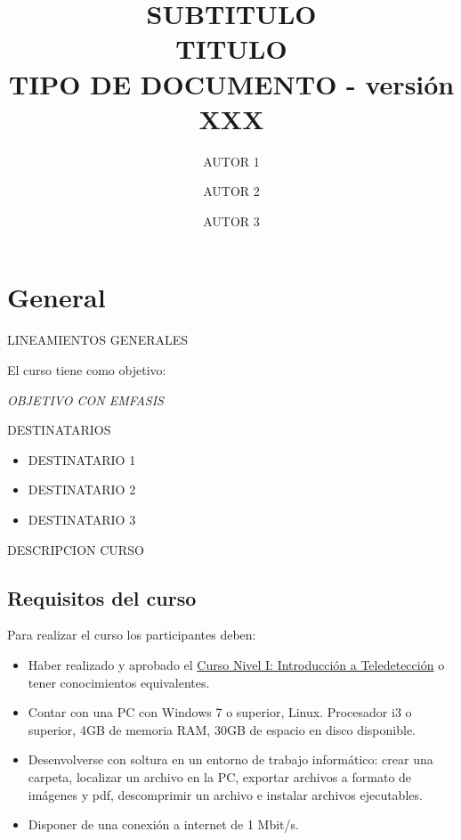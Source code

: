 \documentclass[12pt]{report}
\title{\vfill{\large SUBTITULO} \\ TITULO \\ {\large TIPO DE DOCUMENTO - versión XXX}}
\author[*]{AUTOR 1}
\author[*]{AUTOR 2}
\author[*]{AUTOR 3}
\affil[*]{Unidad de Formación Masiva}
\date{}
\begin{document}
\maketitle
\titlepage
%
\addtolength{\voffset}{-2cm}
\addtolength{\headsep}{0.5cm}
\addtolength{\textheight}{1cm}
\newpage
\tableofcontents


\chapter{General}

LINEAMIENTOS GENERALES

El curso tiene como objetivo:

\begin{displayquote}
\emph{OBJETIVO CON EMFASIS}
\end{displayquote}

DESTINATARIOS

\begin{itemize}
    \item DESTINATARIO 1
    \item DESTINATARIO 2
    \item DESTINATARIO 3
\end{itemize}

DESCRIPCION CURSO

\section{Requisitos del curso}

Para realizar el curso los participantes deben:

\begin{itemize}
    \item Haber realizado y aprobado el \href{https://www.argentina.gob.ar/cursos-y-capacitaciones/nivel-i-introduccion-la-teledeteccion}{Curso Nivel I: Introducción a Teledetección} o tener conocimientos equivalentes. 
    \item Contar con una PC con Windows 7 o superior, Linux. Procesador i3 o superior, 4GB de memoria RAM, 30GB de espacio en disco disponible.
    \item Desenvolverse con soltura en un entorno de trabajo informático: crear una carpeta, localizar un archivo en la PC, exportar archivos a formato de imágenes y pdf, descomprimir un archivo e instalar archivos ejecutables.
    \item Disponer de una conexión a internet de 1 Mbit/s.
\end{itemize}
\end{document}
